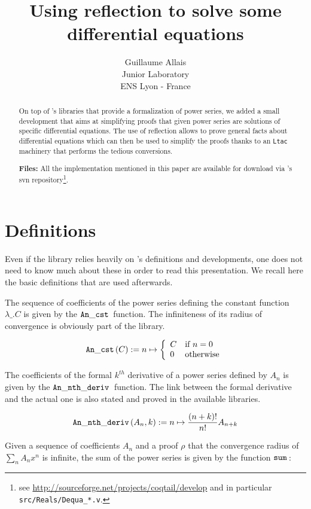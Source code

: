 \documentclass{article}
\title{Using reflection to solve some differential equations}
\author{Guillaume Allais\\
Junior Laboratory \coqtail{}\\
ENS Lyon - France}
\begin{document}
\maketitle{}

\begin{abstract}
On top of \coqtail{}'s libraries that provide a formalization of power series, we
added a small development that aims at simplifying proofs that given power
series are solutions of specific differential equations. The use of reflection
allows to prove general facts about differential equations which can then be
used to simplify the proofs thanks to an \texttt{Ltac} machinery that performs
the tedious conversions.

\textbf{Files:} All the implementation mentioned in this paper are
available for download via \coqtail{}'s svn repository\footnote{see
\url{http://sourceforge.net/projects/coqtail/develop}
and in particular \texttt{src/Reals/Dequa\_*.v}.}.
\end{abstract}

\section{Definitions}

Even if the \dequa{} library relies heavily on \coqtail{}'s \Rpser{}
definitions and developments, one does not need to know much about these in
order to read this presentation. We recall here the basic definitions that
are used afterwards.

The sequence of coefficients of the power series defining the constant function
$\lambda\_. C$ is given by the $\operatorname{\mathtt{An\_cst}}{}$ function. The infiniteness of its radius
of convergence is obviously part of the library.

$$\operatorname{\mathtt{An\_cst}}{}(C) := n \mapsto \left\lbrace
\begin{array}{ll}
C & \text{if } n = 0\\
0 & \text{otherwise}
\end{array}
\right.$$

The coefficients of the formal $k^{th}$ derivative of a power series defined by
$A_n$ is given by the $\operatorname{\mathtt{An\_nth\_deriv}}{}$ function. The link between the formal derivative
and the actual one is also stated and proved in the available libraries.

$$\operatorname{\mathtt{An\_nth\_deriv}}{}(A_n, k) := n \mapsto \frac{(n + k)!}{n!}A_{n+k}$$

Given a sequence of coefficients $A_n$ and a proof $\rho$ that the convergence
radius of $\sum_n A_n x^n$ is infinite, the sum of the power series is given by
the function $\operatorname{\mathtt{sum}}{}$:
\end{document}
